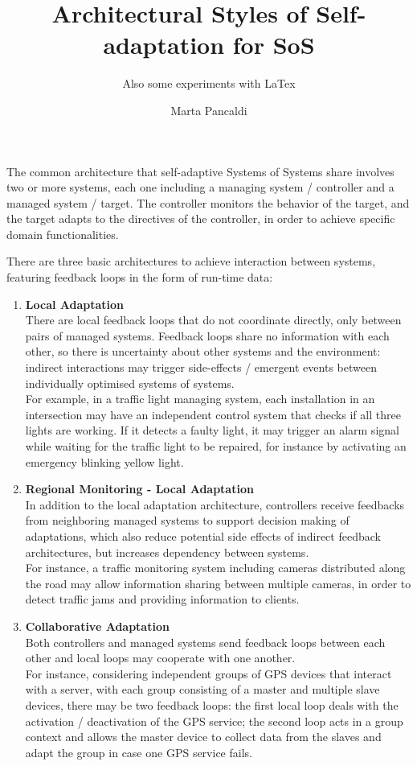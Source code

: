 \documentclass[10pt]{scrartcl}
\begin{document}
\title{Architectural Styles of Self-adaptation for SoS}
\subtitle{Also some experiments with LaTex}
\author{Marta Pancaldi}
\maketitle

The common architecture that self-adaptive Systems of Systems share involves two or more systems, each one including a managing system / controller and a managed system / target. The controller monitors the behavior of the target, and the target adapts to the directives of the controller, in order to achieve specific domain functionalities. \par
There are three basic architectures to achieve interaction between systems, featuring feedback loops in the form of run-time data:

\begin{enumerate}
\item \textbf{Local Adaptation}\\
There are local feedback loops that do not coordinate directly, only between pairs of managed systems. Feedback loops share no information with each other, so there is uncertainty about other systems and the environment: indirect interactions may trigger side-effects / emergent events between individually optimised systems of systems.\\
For example, in a traffic light managing system, each installation in an intersection may have an independent control system that checks if all three lights are working. If it detects a faulty light, it may trigger an alarm signal while waiting for the traffic light to be repaired, for instance by activating an emergency blinking yellow light.

\item \textbf{Regional Monitoring - Local Adaptation }\\
In addition to the local adaptation architecture, controllers receive feedbacks from neighboring managed systems to support decision making of adaptations, which also reduce potential side effects of indirect feedback architectures, but increases dependency between systems. \\
For instance, a traffic monitoring system including cameras distributed along the road may allow information sharing between multiple cameras, in order to detect traffic jams and providing information to clients.

\item \textbf{Collaborative Adaptation} \\
Both controllers and managed systems send feedback loops between each other and local loops may cooperate with one another. \\
For instance, considering independent groups of GPS devices that interact with a server, with each group consisting of a master and multiple slave devices, there may be two feedback loops: the first local loop deals with the activation / deactivation of the GPS service; the second loop acts in a group context and allows the master device to collect data from the slaves and adapt the group in case one GPS service fails.
\end{enumerate}
\end{document}
